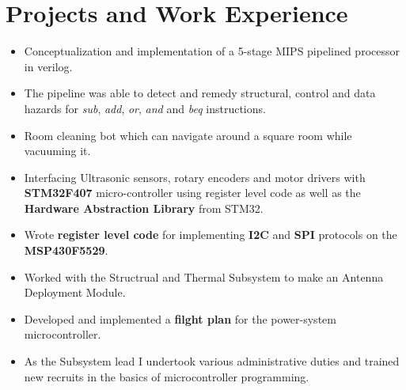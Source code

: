 \documentclass{resume}
\begin{document}
\section{Projects and Work Experience}
    \begin{itemize}\setlength{\itemsep}{0pt}\setlength{\parskip}{0pt}\vspace{-0.5em}
        \item Conceptualization and implementation of a 5-stage MIPS pipelined processor in verilog.
        \item The pipeline was able to detect and remedy structural, control and data hazards for \emph{sub}, \emph{add}, \emph{or}, \emph{and} and \emph{beq} instructions.
    \end{itemize}
\begin{itemize}\setlength{\itemsep}{0pt}\setlength{\parskip}{0pt}\vspace{-0.5em}
    \item Room cleaning bot which can navigate around a square room while vacuuming it.
    \item Interfacing Ultrasonic sensors, rotary encoders and motor drivers with \textbf{STM32F407} micro-controller using register level code as well as the \textbf{Hardware Abstraction Library} from STM32.
\end{itemize}
\begin{itemize}\setlength{\itemsep}{0pt}\setlength{\parskip}{0pt}\vspace{-0.5em}
    \item Wrote \textbf{register level code} for implementing \textbf{I2C} and \textbf{SPI} protocols on the \textbf{MSP430F5529}.
    \item Worked with the Structrual and Thermal Subsystem to make an Antenna Deployment Module.
    \item Developed and implemented a \textbf{filght plan} for the power-system microcontroller.
    \item As the Subsystem lead I undertook various administrative duties and trained new recruits in the basics of microcontroller programming.
\end{itemize}
\end{document}
